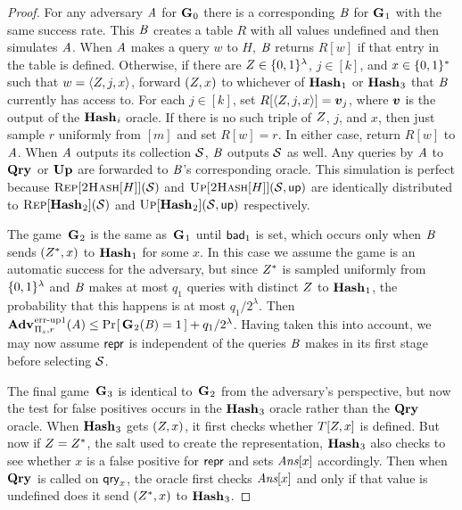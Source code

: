 \begin{proof}
For any adversary $\mathit{A}$ for $\mathbf{G}\hspace{0.5pt}_0$ there is a corresponding $\mathit{B}$ for $\mathbf{G}\hspace{0.5pt}_1$ with the same success rate. This $\mathit{B}$ creates a table $R$ with all values undefined and then simulates $\mathit{A}$. When $\mathit{A}$ makes a query $w$ to $H$, $\mathit{B}$ returns $R[w]$ if that entry in the table is defined. Otherwise, if there are $Z \in \{0,1\}^\lambda$, $j \in [k]$, and $x \in \{0,1\}^*$ such that $w = \langle Z, j, x\rangle$, forward $(Z,x)$ to whichever of $\mathbf{Hash}\hspace{0.5pt}_1$ or $\mathbf{Hash}\hspace{0.5pt}_3$ that $\mathit{B}$ currently has access to. For each $j \in [k]$, set $R[\langle\salt, j, x\rangle] = \vv_j$, where $\vv$ is the output of the $\mathbf{Hash}\hspace{0.5pt}_i$ oracle. If there is no such triple of $Z$, $j$, and $x$, then just sample $r$ uniformly from $[m]$ and set $R[w] = r$. In either case, return $R[w]$ to $\mathit{A}$. When $\mathit{A}$ outputs its collection $\mathcal{S}$, $\mathit{B}$ outputs $\mathcal{S}$ as well. Any queries by $\mathit{A}$ to $\mathbf{Qry}\hspace{0.5pt}$ or $\mathbf{Up}\hspace{0.5pt}$ are forwarded to $\mathit{B}$'s corresponding oracle. This simulation is perfect because $\textsc{Rep}[\textsc{2Hash}[H]](\mathcal{S})$ and $\textsc{Up}[\textsc{2Hash}[H]](\mathcal{S},\mathsf{up})$ are identically distributed to $\textsc{Rep}[\mathbf{Hash}\hspace{0.5pt}_2](\mathcal{S})$ and $\textsc{Up}[\mathbf{Hash}\hspace{0.5pt}_2](\mathcal{S},\mathsf{up})$ respectively.

The game~$\mathbf{G}\hspace{0.5pt}_2$ is the same as~$\mathbf{G}\hspace{0.5pt}_1$ until $\mathsf{bad}_1$ is set, which occurs only when $\mathit{B}$ sends $(Z^*,x)$ to $\mathbf{Hash}\hspace{0.5pt}_1$ for some $x$. In this case we assume the game is an automatic success for the adversary, but since $Z^*$ is sampled uniformly from $\{0,1\}^\lambda$ and $\mathit{B}$ makes at most $q_1$ queries with distinct $Z$ to $\mathbf{Hash}\hspace{0.5pt}_1$, the probability that this happens is at most $q_1/2^\lambda$. Then $\Adv{\errep1}_{\struct_s,r}(\advA) \le \Prob{\G_2(\advB) = 1} + q_1/2^\lambda$. Having taken this into account, we may now assume $\mathsf{repr}$ is independent of the queries $\mathit{B}$ makes in its first stage before selecting $\mathcal{S}$.

The final game~$\mathbf{G}\hspace{0.5pt}_3$ is identical to~$\mathbf{G}\hspace{0.5pt}_2$ from the adversary's perspective, but now the test for false positives occurs in the $\mathbf{Hash}\hspace{0.5pt}_3$ oracle rather than the $\mathbf{Qry}\hspace{0.5pt}$ oracle. When $\mathbf{Hash}\hspace{0.5pt}_3$ gets $(Z,x)$, it first checks whether $T[Z,x]$ is defined. But now if $Z = Z^*$, the salt used to create the representation, $\mathbf{Hash}\hspace{0.5pt}_3$ also checks to see whether $x$ is a false positive for $\mathsf{repr}$ and sets $\textit{Ans}[x]$ accordingly. Then when $\mathbf{Qry}\hspace{0.5pt}$ is called on $\mathsf{qry}_x$, the oracle first checks $\textit{Ans}[x]$ and only if that value is undefined does it send $(Z^*,x)$ to $\mathbf{Hash}\hspace{0.5pt}_3$.


\end{proof}

